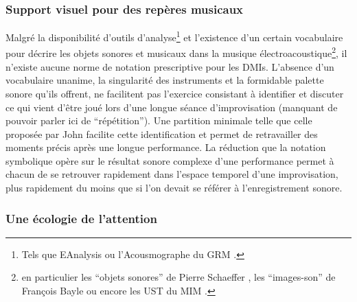 \subsubsection{Support visuel pour des repères musicaux}

\noindent Malgré la disponibilité d'outils d'analyse\footnote{Tels que EAnalysis \cite{couprie_eanalysis:_2016} ou l'Acousmographe du \gls{GRM} \cite{favreau_lacousmographe_2010}.} et l'existence d'un certain vocabulaire pour décrire les objets sonores et musicaux dans la musique électroacoustique\footnote{en particulier les ``objets sonores'' de Pierre Schaeffer \cite{schaeffer_traite_1966}, les ``images-son'' de François Bayle \cite{bayle_musique_1993} ou encore les \gls{UST} du \gls{MIM} \cite{delalande_les_1996}.}, il n'existe aucune norme de notation prescriptive pour les \glspl{DMI}. L'absence d'un vocabulaire unanime, la singularité des instruments et la formidable palette sonore qu'ils offrent, ne facilitent pas l'exercice consistant à identifier et discuter ce qui vient d'être joué lors d'une longue séance d'improvisation (manquant de pouvoir parler ici de ``répétition''). Une partition minimale telle que celle proposée par John facilite cette identification et permet de retravailler des moments précis après une longue performance. La réduction que la notation symbolique opère sur le résultat sonore complexe d'une performance permet à chacun de se retrouver rapidement dans l'espace temporel d'une improvisation, plus rapidement du moins que si l'on devait se référer à l'enregistrement sonore.

\subsubsection{Une écologie de l'attention}

